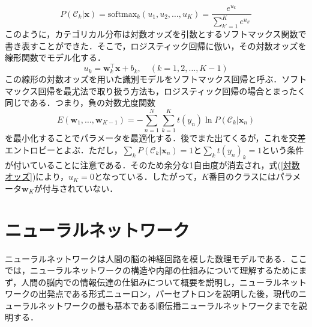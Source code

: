 \documentclass[a4paper,11pt]{jsreport}
\begin{document}
\begin{equation}
  P(\mathcal{C}_k | \bm{x})
  = \text{softmax}_k (u_1, u_2, \dots, u_K) 
  = \frac{e^{u_k}}{\sum_{k'=1}^{K} e^{u_{k'}}}
  \label{対数オッズ}
\end{equation}
このように，カテゴリカル分布は対数オッズを引数とするソフトマックス関数で書き表すことができた．そこで，ロジスティック回帰に倣い，その対数オッズを線形関数でモデル化する．
\begin{equation}
  u_k = \bm{w}_k^{\top} \bm{x} + b_k, \quad (k = 1,2,\dots,K-1)
\end{equation}
この線形の対数オッズを用いた識別モデルをソフトマックス回帰と呼ぶ．ソフトマックス回帰を最尤法で取り扱う方法も，ロジスティック回帰の場合とまったく同じである．つまり，負の対数尤度関数
\begin{equation}
  E(\bm{w}_1,\dots,\bm{w}_{K-1})
  = -\sum_{n=1}^{N}\sum_{k=1}^{K} t(y_n) \ln{P(\mathcal{C}_k | \bm{x}_n)}
  \label{ソフトマックス交差エントロピー}
\end{equation}
を最小化することでパラメータを最適化する．後でまた出てくるが，これを交差エントロピーとよぶ．ただし，$\sum_{k} P(\mathcal{C}_k | \bm{x}_n) = 1$と$\sum_{k} t(y_n)_k = 1$という条件が付いていることに注意である．そのため余分な1自由度が消去され，式(\ref{対数オッズ})により，$u_K=0$となっている．したがって，$K$番目のクラスにはパラメータ$\bm{w}_K$が付与されていない．


\section{ニューラルネットワーク}
ニューラルネットワークは人間の脳の神経回路を模した数理モデルである．ここでは，ニューラルネットワークの構造や内部の仕組みについて理解するためにまず，人間の脳内での情報伝達の仕組みについて概要を説明し，ニューラルネットワークの出発点である形式ニューロン，パーセプトロンを説明した後，現代のニューラルネットワークの最も基本である順伝播ニューラルネットワークまでを説明する．\par
\end{document}
